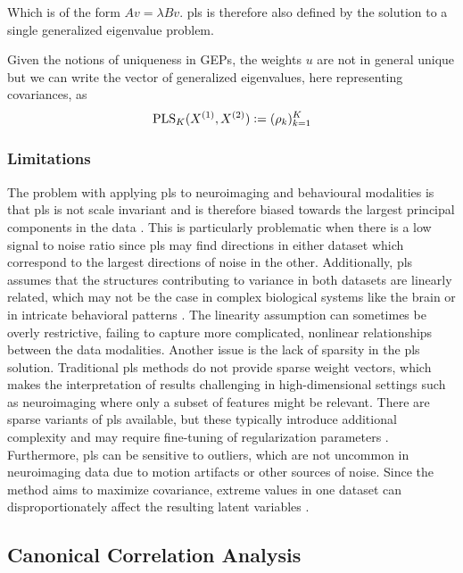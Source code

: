 Which is of the form $A v = \lambda B v$. \acrshort{pls} is therefore also defined by the solution to a single generalized eigenvalue problem.

Given the notions of uniqueness in GEPs, the weights $u$ are not in general unique but we can write the vector of generalized eigenvalues, here representing covariances, as
\begin{align}
    \label{eq:cca-vector-of-correlations-def}
    \operatorname{PLS}_K(X^{(1)},X^{(2)}) \vcentcolon= (\rho_k)_{k=1}^K
\end{align}

\subsubsection{Limitations} The problem with applying \acrshort{pls} to neuroimaging and behavioural modalities is that \acrshort{pls} is not scale invariant and
is therefore biased towards the largest principal components in the data \citep{helmer2020stability}.
This is particularly problematic when there is a low signal to noise ratio since \acrshort{pls} may find directions in either dataset which correspond to the largest directions of noise in the other.
Additionally, \acrshort{pls} assumes that the structures contributing to variance in both datasets are linearly related, which
may not be the case in complex biological systems like the brain or in intricate behavioral patterns \citep{rosipal2005overview}.
The linearity assumption can sometimes be overly restrictive, failing to capture more complicated, nonlinear relationships between the data modalities.
Another issue is the lack of sparsity in the \acrshort{pls} solution.
Traditional \acrshort{pls} methods do not provide sparse weight vectors, which makes the interpretation of results challenging in high-dimensional settings such as neuroimaging where only a subset of features might be relevant.
There are sparse variants of \acrshort{pls} available, but these typically introduce additional complexity and may require fine-tuning of regularization parameters \citep{chun2010sparse, witten2009penalized}.
Furthermore, \acrshort{pls} can be sensitive to outliers, which are not uncommon in neuroimaging data due to motion artifacts or other sources of noise.
Since the method aims to maximize covariance, extreme values in one dataset can disproportionately affect the resulting latent variables \citep{Wold1973}.

\subsection{Canonical Correlation Analysis}\label{sec:cca}

